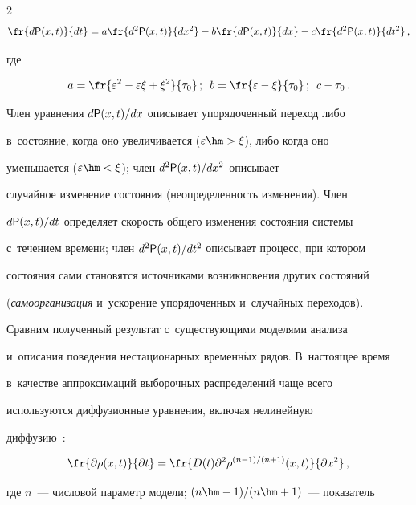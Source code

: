 \begin{multicols}{2}
\begin{equation}
\fr{d{\sf P}(x,t)}{dt} =a\fr{ d^2{\sf P}(x,t)}{dx^2} -b\fr{ d{\sf P}(x,t)}{dx} -c\fr{ 


d^2{\sf P}(x,t)}{dt^2}\,,


\label{e3-hv}


\end{equation}


где 


$$


a=\fr{\varepsilon^2-\varepsilon\xi+\xi^2}{\tau_0}\,;\enskip b=\fr{\varepsilon -


\xi}{\tau_0}\,;\enskip c-\tau_0\,.


$$


  


  Член уравнения $d{\sf P}(x,t)/dx$ описывает упорядоченный переход либо 


в~состояние, когда оно увеличивается ($\varepsilon\hm > \xi$), либо когда оно 


уменьшается ($\varepsilon \hm <\xi$); член $d^2{\sf P}(x,t)/dx^2$ описывает 


случайное изменение состояния (неопределенность изменения). Член 


$d{\sf P}(x,t)/dt$ определяет скорость общего изменения состояния системы 


с~течением времени; член $d^2{\sf P}(x,t)/dt^2$ описывает процесс, при котором 


состояния сами становятся источниками возникновения других состояний 


(\textit{самоорганизация} и~ускорение упорядоченных и~случайных переходов).


  


  Сравним полученный результат с~су\-щест\-ву\-ющи\-ми моделями анализа 


и~описания поведения нестационарных временн$\acute{\mbox{ы}}$х рядов. В~настоящее время 


в~качестве аппроксимаций выборочных распределений чаще всего 


используются диффузионные уравнения, включая нелинейную 


диффузию~\cite{18-hv}:


  $$


  \fr{\partial \rho(x,t)}{\partial t} =\fr{D(t)\partial^2\rho^{(n-1)/(n+1)}(x,t)}{\partial x^2}\,,


  $$


  где $n$~--- числовой параметр модели; $(n\hm-1)/(n\hm+1)$~--- показатель 



\end{multicols}
